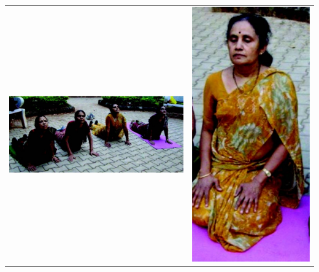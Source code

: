 \begin{center}
\begin{tabular}{@{}cc@{}}
\includegraphics[scale=1.4]{images/092.jpg} &
\includegraphics[scale=.7]{images/093.jpg}\\

\end{tabular}
\end{center}
